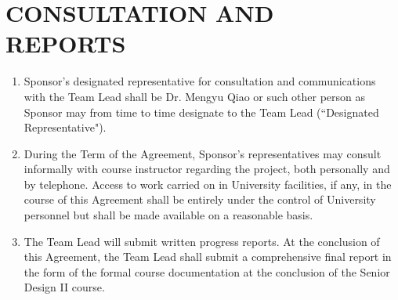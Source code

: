 \documentclass[11pt]{article}
\begin{document}
\section{CONSULTATION AND REPORTS}     
\begin{enumerate}  \itemsep4pt \parskip0pt 
\item  Sponsor's designated representative for consultation and       communications with the Team Lead shall be Dr. Mengyu Qiao    or such other person as Sponsor       may from time to time designate to the Team Lead (``Designated Representative").    

\item During the Term of the Agreement, Sponsor's representatives may       consult informally with course instructor regarding the       project, both personally and by telephone. Access to work carried       on in University facilities, if any, in the course of this Agreement shall       be entirely under the control of University personnel but shall be       made available on a reasonable basis.    

\item The Team Lead will submit written progress reports. At the conclusion of this Agreement, the Team Lead shall submit a comprehensive final report in the form of the formal course documentation at the conclusion of the Senior Design II course. 
\end{enumerate}
\end{document}
